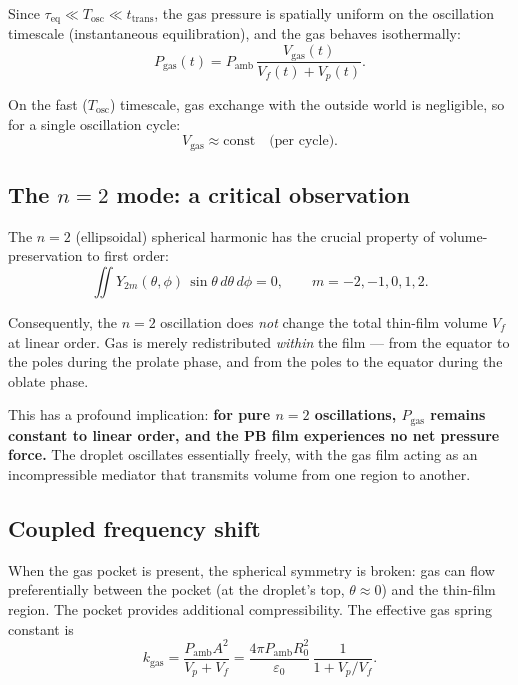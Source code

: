 \documentclass[%
 preprint,
 superscriptaddress,
 amsmath,amssymb,
 aps, prl,
]{revtex4-2}
\begin{document}
Since $\tau_{\text{eq}} \ll T_{\text{osc}} \ll t_{\text{trans}}$,
the gas pressure is spatially uniform on the oscillation timescale
(instantaneous equilibration), and the gas behaves isothermally:
\begin{equation}
P_{\text{gas}}(t) = P_{\text{amb}}\,
\frac{V_{\text{gas}}(t)}{V_f(t) + V_p(t)}.
\label{eq:ideal_gas}
\end{equation}

On the fast ($T_{\text{osc}}$) timescale, gas exchange with the outside
world is negligible, so for a single oscillation cycle:
\begin{equation}
V_{\text{gas}} \approx \text{const} \quad \text{(per cycle)}.
\end{equation}

\subsection{The $n=2$ mode: a critical observation}

The $n=2$ (ellipsoidal) spherical harmonic has the crucial property
of volume-preservation to first order:
\begin{equation}
\iint Y_{2m}(\theta,\phi)\,\sin\theta\,d\theta\,d\phi = 0,
\qquad m = -2,-1,0,1,2.
\end{equation}

Consequently, the $n=2$ oscillation does \emph{not} change the total
thin-film volume $V_f$ at linear order.  Gas is merely redistributed
\emph{within} the film --- from the equator to the poles during the
prolate phase, and from the poles to the equator during the oblate phase.

This has a profound implication: \textbf{for pure $n=2$ oscillations,
$P_{\text{gas}}$ remains constant to linear order, and the PB film
experiences no net pressure force.}  The droplet oscillates essentially
freely, with the gas film acting as an incompressible mediator that
transmits volume from one region to another.

\subsection{Coupled frequency shift}

When the gas pocket is present, the spherical symmetry is broken:
gas can flow preferentially between the pocket (at the droplet's top,
$\theta \approx 0$) and the thin-film region.  The pocket provides
additional compressibility.  The effective gas spring constant is
\begin{equation}
k_{\text{gas}} = \frac{P_{\text{amb}} A^2}{V_p + V_f}
= \frac{4\pi P_{\text{amb}} R_0^2}{\varepsilon_0}\,
\frac{1}{1 + V_p/V_f}.
\end{equation}
\end{document}
